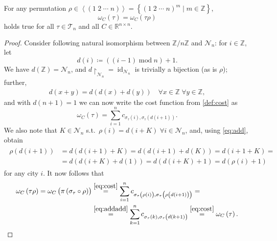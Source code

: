 \documentclass[titlepage,twoside,index=totoc,bibliography=totoc]{scrartcl}
\numberwithin{equation}{section}
\numberwithin{figure}{section}
\numberwithin{table}{section}
\begin{document}
\begin{proposition}
\label{prop:rotinv}
  For any permutation $\rho \in \left<\left(1 \; 2 \; \cdots \; n \right)\right>
  = \left\{{\left(1 \; 2 \; \cdots \; n \right)}^m \mid m \in \mathbb{Z} \right\}$,
  \[
    \omega_C\left(\tau\right) = \omega_C\left(\tau \rho\right)
  \]
  holds true for all $\tau \in \mathcal{T}_n$ and all $C \in \mathbb{R}^{n \times n}$.
\end{proposition}
\begin{proof}
  Consider following natural isomorphism between $\mathbb{Z}/n\mathbb{Z}$ and $\mathcal{N}_n$:
  for $i \in \mathbb{Z}$, let
  \[
    d\left(i\right) \coloneqq \left(\left(i-1\right)\operatorname{mod} n\right)+1.
  \]
  We have $d\left(\mathbb{Z}\right) = \mathcal{N}_n$,
  and $d\restriction_{\mathcal{N}_n} = \operatorname{id}_{\mathcal{N}_n}$
  is trivially a bijection (as is $\rho$); further,
  \begin{align}
    \label{eq:add}
    d\left(x+y\right) =
    d\left(d\left(x\right) + d\left(y\right)\right)
    \quad \forall x \in \mathbb{Z} \; \forall y \in \mathbb{Z},
  \end{align}
  and with $d\left(n+1\right) = 1$ we can now write the cost function from \cref{def:cost} as
  \begin{equation}
  \label{eq:cost}
    \omega_C\left(\tau\right) =
    \sum_{i=1}^n c_{\sigma_\tau\left(i\right),\sigma_\tau\left(d\left(i+1\right)\right)}.
  \end{equation}
  We also note that \exists $K \in \mathcal{N}_n$ s.t.\ 
  $\rho\left(i\right) = d\left(i+K\right) \; \forall i \in \mathcal{N}_n$,
  and, using \cref{eq:add}, obtain
  \begin{align}
    \label{eq:addadd}
    \begin{split}
    \rho \left(d\left(i+1\right)\right)
    & =
    d\left(d\left(i+1\right)+K\right) =
    d\left(d\left(i+1\right)+d\left(K\right)\right) =
    d\left(i+1+K\right) =
    \\
    & =
    d\left(d\left(i+K\right)+d\left(1\right)\right) =
    d\left(d\left(i+K\right)+1\right) =
    d\left(\rho\left(i\right)+1\right)
    \end{split}
  \end{align}
  for any city $i$.
  It now follows that
  \begin{align*}
    \omega_C\left(\tau \rho\right) =
    \omega_C\left(\pi\left(\sigma_\tau \circ \rho\right)\right)
    & \stackrel{\eqref{eq:cost}}{=}
    \sum_{i=1}^n c_{\sigma_\tau\left(\rho\left(i\right)\right),
                    \sigma_\tau\left(\rho\left(d\left(i+1\right)\right)\right)}
    =
    \\
    & \stackrel{\eqref{eq:addadd}}{=}
    \sum_{k=1}^n c_{\sigma_\tau\left(k\right),
                    \sigma_\tau\left(d\left(k+1\right)\right)}
    \stackrel{\eqref{eq:cost}}{=}
    \omega_C\left(\tau\right).
  \end{align*}
\end{proof}
\end{document}
